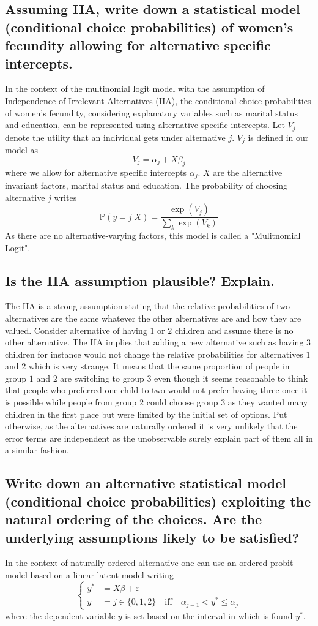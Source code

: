 \documentclass[12pt]{article}
\begin{document}
\subsection{Assuming IIA, write down a statistical model (conditional choice probabilities) of women’s fecundity allowing for alternative specific intercepts.}

In the context of the multinomial logit model with the assumption of Independence of Irrelevant Alternatives (IIA), the conditional choice probabilities of women's fecundity, considering explanatory variables such as marital status and education, can be represented using alternative-specific intercepts. Let $V_{j}$ denote the utility that an individual gets under alternative $j$. $V_j$ is defined in our model as
$$V_j = \alpha_j + X\beta_j$$
where we allow for alternative specific intercepts $\alpha_j$. $X$ are the alternative invariant factors, marital status and education.
The probability of choosing alternative $j$ writes
$$\mathbb{P}(y = j|X) = \frac{\exp(V_j)}{\sum_k \exp(V_k)}$$
As there are no alternative-varying factors, this model is called a "Mulitnomial Logit".
\subsection{Is the IIA assumption plausible? Explain.}
The IIA is a strong assumption stating that the relative probabilities of two alternatives are the same whatever the other alternatives are and how they are valued. Consider alternative of having $1$ or $2$ children and assume there is no other alternative. The IIA implies that adding a new alternative such as having 3 children for instance would not change the relative probabilities for alternatives $1$ and $2$ which is very strange. It means that the same proportion of people in group $1$ and $2$ are switching to group $3$ even though it seems reasonable to think that people who preferred one child to two would not prefer having three once it is possible while people from group $2$ could choose group $3$ as they wanted many children in the first place but were limited by the initial set of options. Put otherwise, as the alternatives are naturally ordered it is very unlikely that the error terms are independent as the unobservable surely explain part of them all in a similar fashion.
\subsection{Write down an alternative statistical model (conditional choice probabilities) exploiting the natural ordering of the choices. Are the underlying assumptions likely to be satisfied?}
In the context of naturally ordered alternative one can use an ordered probit model based on a linear latent model writing
\[
\begin{cases}
y^* &= X\beta + \varepsilon \\
y &= j \in \{0, 1, 2\} \quad  \text{iff} \quad \alpha_{j-1} < y^* \leq \alpha_j
\end{cases}
\]
where the dependent variable $y$ is set based on the interval in which is found $y^*$.
\end{document}
